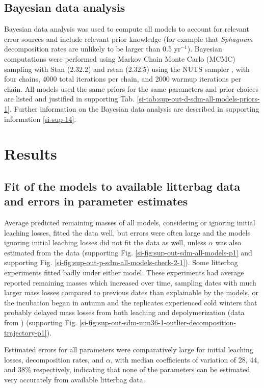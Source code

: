\documentclass[bg, manuscript]{copernicus}
\begin{document}
\subsection{Bayesian data analysis}

Bayesian data analysis was used to compute all models to account for relevant error sources and include relevant prior knowledge (for example that \emph{Sphagnum} decomposition rates are unlikely to be larger than 0.5 yr\(^{-1}\)). Bayesian computations were performed using Markov Chain Monte Carlo (MCMC) sampling with Stan (2.32.2) \citep{StanDevelopmentTeam.2021a} and rstan (2.32.5) \citep{StanDevelopmentTeam.2021b} using the NUTS sampler \citep{Hoffman.2014}, with four chains, 4000 total iterations per chain, and 2000 warmup iterations per chain. All models used the same priors for the same parameters and prior choices are listed and justified in supporting Tab. \ref{si-tab:sup-out-d-sdm-all-models-priors-1}. Further information on the Bayesian data analysis are described in supporting information \ref{si-sup-14}.

\section{Results}

\subsection{Fit of the models to available litterbag data and errors in parameter estimates}

Average predicted remaining masses of all models, considering or ignoring initial leaching losses, fitted the data well, but errors were often large and the models ignoring initial leaching losses did not fit the data as well, unless \(\alpha\) was also estimated from the data (supporting Fig. \ref{si-fig:sup-out-sdm-all-models-p1} and supporting Fig. \ref{si-fig:sup-out-p-sdm-all-models-check-2-1}).
Some litterbag experiments fitted badly under either model. These experiments had average reported remaining masses which increased over time, sampling dates with much larger mass losses compared to previous dates than explainable by the models, or the incubation began in autumn and the replicates experienced cold winters that probably delayed mass losses from both leaching and depolymerization (data from \citet{Golovatskaya.2017}) (supporting Fig. \ref{si-fig:sup-out-sdm-mm36-1-outlier-decomposition-trajectory-p1}).

Estimated errors for all parameters were comparatively large for initial leaching losses, decomposition rates, and \(\alpha\), with median coefficients of variation of 28, 44, and 38\% respectively, indicating that none of the parameters can be estimated very accurately from available litterbag data.
\end{document}
